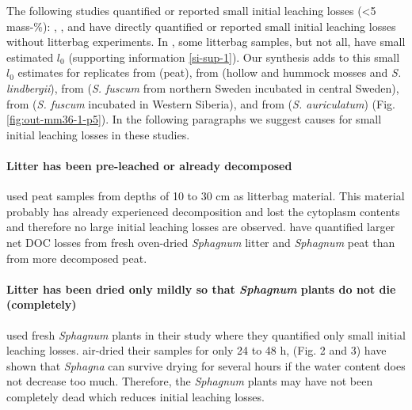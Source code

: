 \documentclass[bg, manuscript]{copernicus}
\begin{document}
The following studies quantified or reported small initial leaching losses (\textless5 mass-\%): \citet{Coulson.1978}, \citet{Thormann.2002}, and \citet{Castells.2005} have directly quantified or reported small initial leaching losses without litterbag experiments. In \citet{Moore.2007}, some litterbag samples, but not all, have small estimated \(l_0\) (supporting information \ref{si-sup-1}). Our synthesis adds to this small \(l_0\) estimates for replicates from \citet{Prevost.1997} (peat), from \citet{Bartsch.1985} (hollow and hummock mosses and \emph{S. lindbergii}), from \citet{Breeuwer.2008} (\emph{S. fuscum} from northern Sweden incubated in central Sweden), from \citet{Golovatskaya.2017} (\emph{S. fuscum} incubated in Western Siberia), and from \citet{Trinder.2008} (\emph{S. auriculatum}) (Fig. \ref{fig:out-mm36-1-p5}). In the following paragraphs we suggest causes for small initial leaching losses in these studies.

\paragraph*{Litter has been pre-leached or already decomposed}

\citet{Prevost.1997} used peat samples from depths of 10 to 30 cm as litterbag material. This material probably has already experienced decomposition and lost the cytoplasm contents and therefore no large initial leaching losses are observed. \citet{Moore.2001} have quantified larger net DOC losses from fresh oven-dried \emph{Sphagnum} litter and \emph{Sphagnum} peat than from more decomposed peat.

\paragraph*{\texorpdfstring{Litter has been dried only mildly so that \emph{Sphagnum} plants do not die (completely)}{Litter has been dried only mildly so that Sphagnum plants do not die (completely)}}

\citet{Castells.2005} used fresh \emph{Sphagnum} plants in their study where they quantified only small initial leaching losses. \citet{Bartsch.1985} air-dried their samples for only 24 to 48 h, \citet{Schipperges.1998} (Fig. 2 and 3) have shown that \emph{Sphagna} can survive drying for several hours if the water content does not decrease too much. Therefore, the \emph{Sphagnum} plants may have not been completely dead which reduces initial leaching losses.
\end{document}
